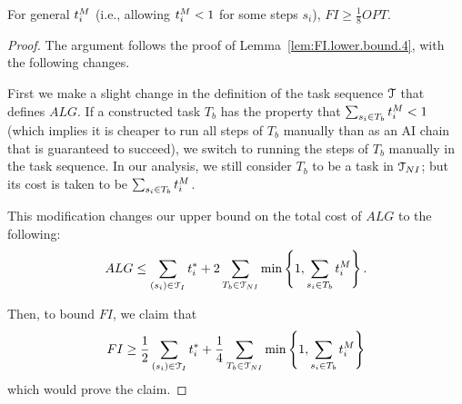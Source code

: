 \begin{lem}
\label{lem:FI.lower.bound.8}
    For general $t^{M}_{i}$ (i.e., allowing $t^{M}_{i} < 1$ for some steps $s_i$), $FI \geq \frac{1}{8}OPT$.
\end{lem}
\begin{proof}
    The argument follows the proof of Lemma~\ref{lem:FI.lower.bound.4}, with the following changes.

    First we make a slight change in the definition of the task sequence $\mathcal{T}$ that defines $ALG$.
    If a constructed task $T_b$ has the property that $\sum_{s_i \in T_b} t^{M}_{i} < 1$ (which implies it is cheaper to run all steps of $T_b$ manually than as an AI chain that is guaranteed to succeed), we switch to running the steps of $T_b$ manually in the task sequence.
    In our analysis, we still consider $T_b$ to be a task in $\mathcal{T}_{NI}$; but its cost is taken to be $\sum_{s_i \in T_b} t^{M}_{i}$.

    This modification changes our upper bound on the total cost of $ALG$ to the following:
    \[ 
    ALG 
    \leq 
    \sum_{ (s_i) \in \mathcal{T}_I} t^*_{i}
    + 
    2 \sum_{T_b \in \mathcal{T}_{NI}} \min\left\{1, \sum_{s_i \in T_b} t^{M}_{i} \right\} . 
    \]

    Then, to bound $FI$, we claim that
    \[ 
    FI 
    \geq 
    \frac{1}{2}\sum_{(s_i) \in \mathcal{T}_I} t^*_{i} 
    +
    \frac{1}{4}\sum_{T_b \in \mathcal{T}_{NI}} \min\left\{1, \sum_{s_i \in T_b} t^{M}_{i} \right\} 
    \]
    which would prove the claim.


\end{proof}
